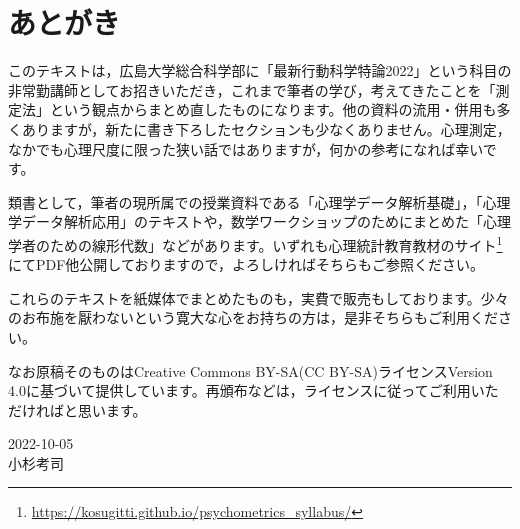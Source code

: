 
\chapter*{あとがき}

このテキストは，広島大学総合科学部に「最新行動科学特論2022」という科目の非常勤講師としてお招きいただき，これまで筆者の学び，考えてきたことを「測定法」という観点からまとめ直したものになります。他の資料の流用・併用も多くありますが，新たに書き下ろしたセクションも少なくありません。心理測定，なかでも心理尺度に限った狭い話ではありますが，何かの参考になれば幸いです。

類書として，筆者の現所属での授業資料である「心理学データ解析基礎」，「心理学データ解析応用」のテキストや，数学ワークショップのためにまとめた「心理学者のための線形代数」などがあります。いずれも心理統計教育教材のサイト\footnote{\url{https://kosugitti.github.io/psychometrics_syllabus/}}にてPDF他公開しておりますので，よろしければそちらもご参照ください。

これらのテキストを紙媒体でまとめたものも，実費で販売もしております。少々のお布施を厭わないという寛大な心をお持ちの方は，是非そちらもご利用ください。


なお原稿そのものはCreative Commons BY-SA(CC BY-SA)ライセンスVersion 4.0に基づいて提供しています。再頒布などは，ライセンスに従ってご利用いただければと思います。

\begin{flushright}
	2022-10-05\\
	小杉考司
\end{flushright}

